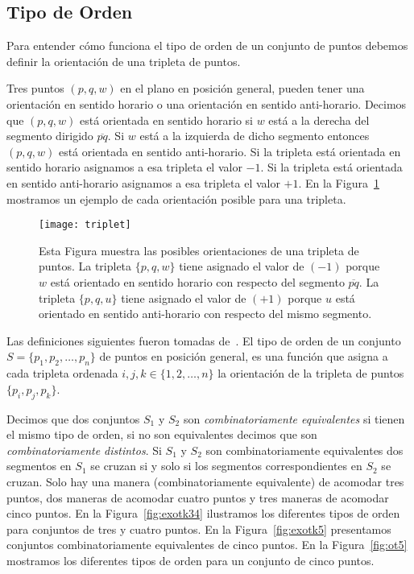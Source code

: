 \subsection{Tipo de Orden}

Para entender cómo funciona el tipo de orden de un conjunto de puntos
debemos definir la orientación de una tripleta de puntos.

Tres puntos $(p,q,w)$ en el plano en posición general, pueden tener una
orientación en sentido horario o una orientación en sentido anti-horario.
Decimos que $(p,q,w)$ está orientada en sentido horario si $w$ está a la
derecha del segmento dirigido $\overline{pq}$. Si $w$ está a la izquierda
de dicho segmento entonces $(p,q,w)$ está orientada en sentido anti-horario.
Si la tripleta está orientada en sentido horario asignamos a esa tripleta el
valor $-1$. Si la tripleta está orientada en sentido anti-horario asignamos a
esa tripleta el valor $+1$. En la Figura~\ref{fig:triplet} mostramos un ejemplo
de cada orientación posible para una tripleta.
\begin{figure}[htpb]
  \centering
  \texttt{[image: triplet]}
  \caption{Esta Figura muestra las posibles orientaciones de una tripleta de
  puntos. La tripleta $\{p,q,w\}$ tiene asignado el valor de $(-1)$ porque $w$
  está orientado en sentido horario con respecto del segmento $\overline{pq}$.
  La tripleta $\{p,q,u\}$ tiene asignado el valor de $(+1)$  porque $u$ está
  orientado en sentido anti-horario con respecto del mismo segmento.}
  \label{fig:triplet}
\end{figure}

Las definiciones siguientes fueron tomadas de~\cite{Aichholzer2002}.
El tipo de orden de un conjunto $S=\{p_1,p_2,\dots,p_n\}$ de puntos en posición
general, es una función que asigna a cada tripleta ordenada
$i,j,k \in \{1,2,\dots,n\}$ la orientación de la tripleta de puntos
$\{p_i,p_j,p_k\}$.

Decimos que dos conjuntos $S_1$ y $S_2$ son \emph{combinatoriamente
equivalentes} si tienen el mismo tipo de orden, si no son
equivalentes decimos que son \emph{combinatoriamente distintos}. Si $S_1$ y
$S_2$ son combinatoriamente equivalentes dos segmentos en $S_1$ se cruzan si y
solo si los segmentos correspondientes en $S_2$ se cruzan. Solo hay una manera
(combinatoriamente equivalente) de acomodar tres puntos,
dos maneras de acomodar cuatro puntos y tres maneras de acomodar cinco puntos.
En la Figura~\ref{fig:exotk34} ilustramos los diferentes tipos de orden
para conjuntos de tres y cuatro puntos. En la Figura~\ref{fig:exotk5}
presentamos conjuntos combinatoriamente equivalentes de cinco puntos. En la
Figura~\ref{fig:ot5} mostramos los diferentes tipos de orden para un conjunto
de cinco puntos.

